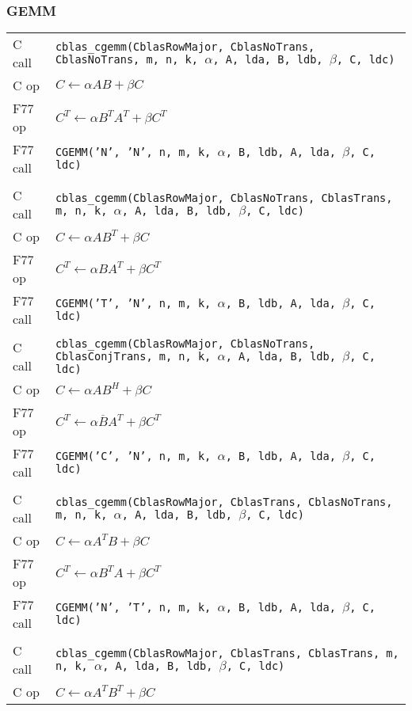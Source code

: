 \documentclass{article}
\begin{document}
\subsubsection{GEMM}
{\footnotesize
\begin{tabular}{ll}
C call   & {\tt cblas\_cgemm(CblasRowMajor, CblasNoTrans, CblasNoTrans, m, n, k, $\alpha$, A, lda, B, ldb, $\beta$, C, ldc)}\\
C op     & $C \leftarrow \alpha A B + \beta C$\\
F77 op   & $C^T \leftarrow \alpha B^T A^T + \beta C^T$\\
F77 call & {\tt CGEMM('N', 'N', n, m, k, $\alpha$, B, ldb, A, lda, $\beta$, C, ldc)}\\\\
%
C call   & {\tt cblas\_cgemm(CblasRowMajor, CblasNoTrans, CblasTrans, m, n, k, $\alpha$, A, lda, B, ldb, $\beta$, C, ldc)}\\
C op     & $C \leftarrow \alpha A B^T + \beta C$\\
F77 op   & $C^T \leftarrow \alpha B A^T + \beta C^T$\\
F77 call & {\tt CGEMM('T', 'N', n, m, k, $\alpha$, B, ldb, A, lda, $\beta$, C, ldc)}\\\\
%
C call   & {\tt cblas\_cgemm(CblasRowMajor, CblasNoTrans, CblasConjTrans, m, n, k, $\alpha$, A, lda, B, ldb, $\beta$, C, ldc)}\\
C op     & $C \leftarrow \alpha A B^H + \beta C$\\
F77 op   & $C^T \leftarrow \alpha \overline{B} A^T + \beta C^T$\\
F77 call & {\tt CGEMM('C', 'N', n, m, k, $\alpha$, B, ldb, A, lda, $\beta$, C, ldc)}\\\\
%
C call   & {\tt cblas\_cgemm(CblasRowMajor, CblasTrans, CblasNoTrans, m, n, k, $\alpha$, A, lda, B, ldb, $\beta$, C, ldc)}\\
C op     & $C \leftarrow \alpha A^T B + \beta C$\\
F77 op   & $C^T \leftarrow \alpha B^T A + \beta C^T$\\
F77 call & {\tt CGEMM('N', 'T', n, m, k, $\alpha$, B, ldb, A, lda, $\beta$, C, ldc)}\\\\
%
C call   & {\tt cblas\_cgemm(CblasRowMajor, CblasTrans, CblasTrans, m, n, k, $\alpha$, A, lda, B, ldb, $\beta$, C, ldc)}\\
C op     & $C \leftarrow \alpha A^T B^T + \beta C$\\

\end{tabular}}
\end{document}

